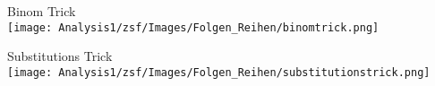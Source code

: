 \begin{KR}{Binom Trick}\\
    \texttt{[image: Analysis1/zsf/Images/Folgen\_Reihen/binomtrick.png]}
\end{KR}
\begin{KR}{Substitutions Trick}\\
    \texttt{[image: Analysis1/zsf/Images/Folgen\_Reihen/substitutionstrick.png]}
\end{KR}